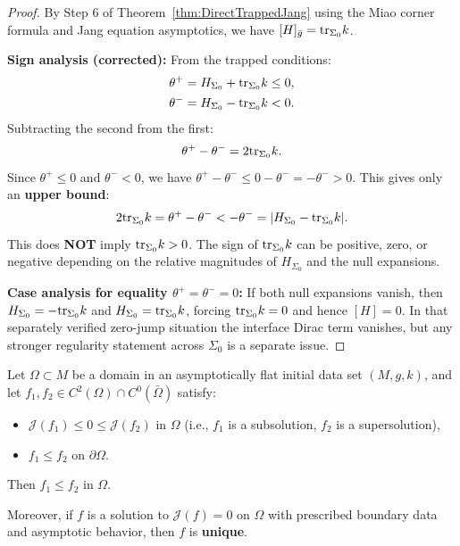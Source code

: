 \begin{proof}
By Step 6 of Theorem~\ref{thm:DirectTrappedJang} using the Miao corner formula and Jang equation asymptotics, we have $[H]_{\bar{g}} = \mathrm{tr}_{\Sigma_0} k$.

\textbf{Sign analysis (corrected):} From the trapped conditions:
\begin{align*}
    \theta^+ &= H_{\Sigma_0} + \mathrm{tr}_{\Sigma_0} k \le 0, \\
    \theta^- &= H_{\Sigma_0} - \mathrm{tr}_{\Sigma_0} k < 0.
\end{align*}
Subtracting the second from the first:
\[
    \theta^+ - \theta^- = 2\mathrm{tr}_{\Sigma_0} k.
\]
Since $\theta^+ \le 0$ and $\theta^- < 0$, we have $\theta^+ - \theta^- \le 0 - \theta^- = -\theta^- > 0$. This gives only an \textbf{upper bound}:
\[
    2\mathrm{tr}_{\Sigma_0} k = \theta^+ - \theta^- < -\theta^- = |H_{\Sigma_0} - \mathrm{tr}_{\Sigma_0} k|.
\]
This does \textbf{NOT} imply $\mathrm{tr}_{\Sigma_0} k > 0$. The sign of $\mathrm{tr}_{\Sigma_0} k$ can be positive, zero, or negative depending on the relative magnitudes of $H_{\Sigma_0}$ and the null expansions.

\textbf{Case analysis for equality $\theta^+ = \theta^- = 0$:} If both null expansions vanish, then $H_{\Sigma_0} = -\mathrm{tr}_{\Sigma_0} k$ and $H_{\Sigma_0} = \mathrm{tr}_{\Sigma_0} k$, forcing $\mathrm{tr}_{\Sigma_0} k = 0$ and hence $[H] = 0$. In that separately verified zero-jump situation the interface Dirac term vanishes, but any stronger regularity statement across $\Sigma_0$ is a separate issue.
\end{proof}

\begin{lemma}\label{lem:JangMaxPrinciple}
Let $\Omega \subset M$ be a domain in an asymptotically flat initial data set $(M, g, k)$, and let $f_1, f_2 \in C^2(\Omega) \cap C^0(\bar{\Omega})$ satisfy:
\begin{itemize}
    \item $\mathcal{J}(f_1) \le 0 \le \mathcal{J}(f_2)$ in $\Omega$ (i.e., $f_1$ is a subsolution, $f_2$ is a supersolution),
    \item $f_1 \le f_2$ on $\partial\Omega$.
\end{itemize}
Then $f_1 \le f_2$ in $\Omega$.

Moreover, if $f$ is a solution to $\mathcal{J}(f) = 0$ on $\Omega$ with prescribed boundary data and asymptotic behavior, then $f$ is \textbf{unique}.
\end{lemma}


